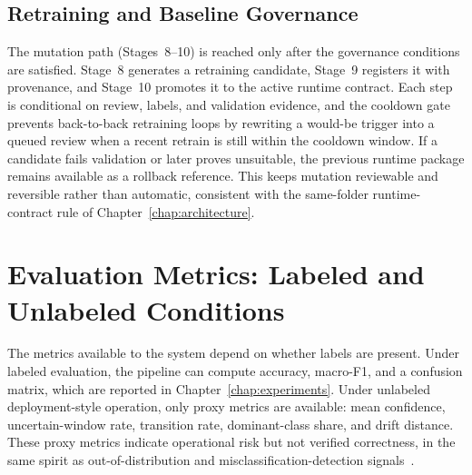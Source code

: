 \subsection{Retraining and Baseline Governance}
\label{sec:retraining_governance}

The mutation path (Stages~8--10) is reached only after the governance conditions are satisfied. Stage~8
generates a retraining candidate, Stage~9 registers it with provenance, and Stage~10 promotes it to the
active runtime contract. Each step is conditional on review, labels, and validation evidence, and the
cooldown gate prevents back-to-back retraining loops by rewriting a would-be trigger into a queued
review when a recent retrain is still within the cooldown window. If a candidate fails validation or
later proves unsuitable, the previous runtime package remains available as a rollback reference. This
keeps mutation reviewable and reversible rather than automatic, consistent with the same-folder
runtime-contract rule of Chapter~\ref{chap:architecture}.

\section{Evaluation Metrics: Labeled and Unlabeled Conditions}
\label{sec:evaluation_metrics}

The metrics available to the system depend on whether labels are present. Under labeled evaluation, the
pipeline can compute accuracy, macro-F1, and a confusion matrix, which are reported in
Chapter~\ref{chap:experiments}. Under unlabeled deployment-style operation, only proxy metrics are
available: mean confidence, uncertain-window rate, transition rate, dominant-class share, and drift
distance. These proxy metrics indicate operational risk but not verified correctness, in the same spirit as out-of-distribution and misclassification-detection signals~\cite{hendrycks2017baseline,liu2020energy}.

